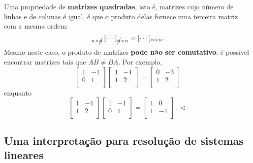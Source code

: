 \begin{ex}
	Uma propriedade de \textbf{matrizes quadradas}, isto é, matrizes cujo número de linhas e de colunas é igual, é que o produto delas fornece uma terceira matriz com a mesma ordem:
	\begin{equation}
	[\cdots]_{n \times \cancel{n}} \, [\cdots]_{\cancel{n} \times n} = [\cdots]_{n \times n}.
	\end{equation} Mesmo neste caso, o produto de matrizes \textbf{pode não ser comutativo}: é possível encontrar matrizes tais que $AB \neq BA$. Por exemplo,
	\begin{equation}
	\left[
	\begin{array}{cc}
	1 & -1  \\
	0 &  1  \\
	\end{array}
	\right]
	\left[
	\begin{array}{cc}
	1 & -1  \\
	1 &  2  \\
	\end{array}
	\right] =
	\left[
	\begin{array}{cc}
	0 & -3  \\
	1 &  2  \\
	\end{array}
	\right]
	\end{equation} enquanto
	\begin{equation}
	\left[
	\begin{array}{cc}
	1 & -1  \\
	1 &  2  \\
	\end{array}
	\right]
	\left[
	\begin{array}{cc}
	1 & -1  \\
	0 &  1  \\
	\end{array}
	\right] =
	\left[
	\begin{array}{cc}
	1 & 0  \\
	1 & -1  \\
	\end{array}
	\right]. \ \lhd
	\end{equation}
\end{ex}





\subsection{Uma interpretação para resolução de sistemas lineares}\label{scn:resolucao-2-sistemas}

